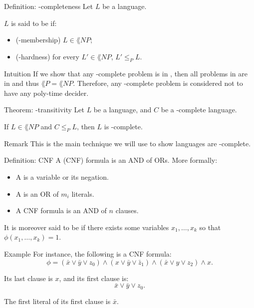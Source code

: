 \documentclass[a4paper]{article}
\begin{document}
\begin{parag}{Definition: -completeness}
    Let $L$ be a language.

    $L$ is said to be  if:
    \begin{itemize}
        \item (-membership) $L \in \lang{NP}$;
        \item (-hardness) for every $L' \in \lang{NP}$, $L' \leq_P L$.
    \end{itemize}

    \begin{subparag}{Intuition}
        If we show that any -complete problem is in , then all problems in  are in  and thus $\lang{P} = \lang{NP}$. Therefore, any -complete problem is considered not to have any poly-time decider.
    \end{subparag}
\end{parag}

\begin{parag}{Theorem: -transitivity}
    Let $L$ be a language, and $C$ be a -complete language.

    If $L \in \lang{NP}$ and $C \leq_P L$, then $L$ is -complete.

    \begin{subparag}{Remark}
        This is the main technique we will use to show languages are -complete.
    \end{subparag}
\end{parag}

\begin{parag}{Definition: CNF}
    A  (CNF) formula is an AND of ORs. More formally:
    \begin{itemize}
        \item A  is a variable or its negation.
        \item A  is an OR of $m_i$ literals.
        \item A CNF formula is an AND of $n$ clauses.
    \end{itemize}

    It is moreover said to be  if there exists some variables $x_1, \ldots, x_k$ so that $\phi\left(x_1, \ldots, x_k\right) = 1$.
    
    \begin{subparag}{Example}
        For instance, the following is a CNF formula: 
        \[\phi = \left(\bar{x} \lor \bar{y} \lor z_0\right) \land \left(x \lor \bar{y} \lor \bar{z}_1\right) \land \left(\bar{x} \lor y \lor z_2\right) \land x.\]

        Its last clause is $x$, and its first clause is: 
        \[\bar{x} \lor \bar{y} \lor z_0.\]

        The first literal of its first clause is $\bar{x}$.
    \end{subparag}
\end{parag}
\end{document}
